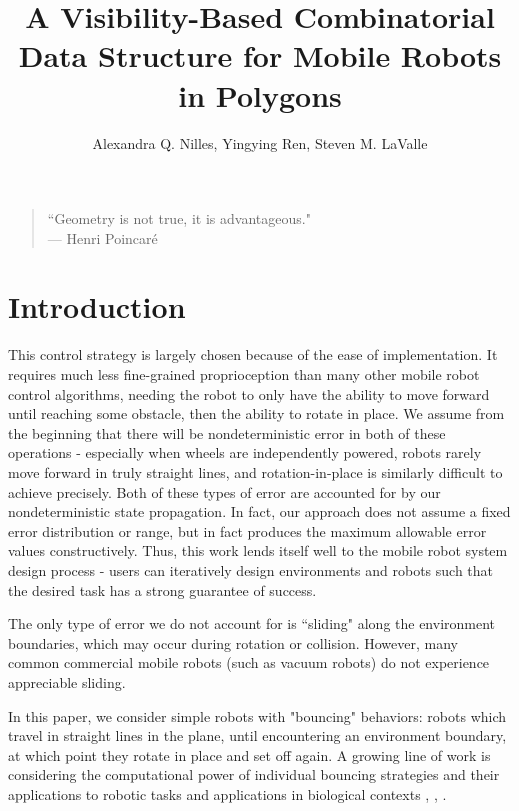 \documentclass[]{article}  %
\title{A Visibility-Based Combinatorial Data Structure for
Mobile Robots in Polygons}
\author{Alexandra Q. Nilles, Yingying Ren, Steven M. LaValle%
}
\begin{document}
\maketitle

%

{\small
\begin{center}
\begin{quotation}
``Geometry is not true, it is advantageous." \\
\hfill    --- Henri Poincar\'e
\end{quotation}
\end{center}
}

\section{Introduction} 

This control strategy is largely chosen because of the ease of implementation.
It requires much less fine-grained proprioception than many other mobile robot
control algorithms, needing the robot to only have the ability to move forward
until reaching some obstacle, then the ability to rotate in place. We assume
from the beginning that there will be nondeterministic error in both of these
operations - especially when wheels are independently powered, robots rarely
move forward in truly straight lines, and rotation-in-place is similarly
difficult to achieve precisely. Both of these types of error are accounted for
by our nondeterministic state propagation. In fact, our approach does not assume
a fixed error distribution or range, but in fact produces the maximum allowable
error values constructively. Thus, this work lends itself well to the mobile
robot system design process - users can iteratively design environments and
robots such that the desired task has a strong guarantee of success.

The only type of error we do not
account for is ``sliding" along the environment boundaries, which may occur
during rotation or collision. However, many common commercial mobile robots
(such as vacuum robots) do not experience appreciable sliding.

In this paper, we consider simple robots with "bouncing" behaviors: robots which
travel in straight lines in the plane, until encountering an environment
boundary, at which point they rotate in place and set off again. A growing line
of work is considering the computational power of individual bouncing strategies
and their applications to robotic tasks and applications in biological contexts
\cite{ErLav13}, \cite{microorganism2017}, \cite{alam2017minimalist}.
\end{document}
